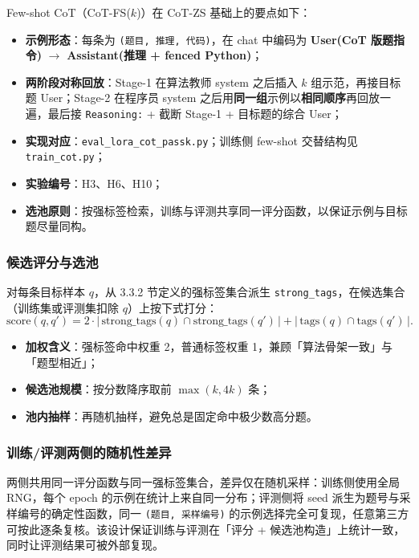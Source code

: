 
Few-shot CoT（CoT-FS($k$)）在 CoT-ZS 基础上的要点如下：
\begin{itemize}
    \item \textbf{示例形态}：每条为 \texttt{(题目, 推理, 代码)}，在 chat 中编码为 \textbf{User(CoT 版题指令)} $\rightarrow$ \textbf{Assistant(推理 + fenced Python)}；
    \item \textbf{两阶段对称回放}：Stage-1 在算法教师 system 之后插入 $k$ 组示范，再接目标题 User；Stage-2 在程序员 system 之后用\textbf{同一组}示例以\textbf{相同顺序}再回放一遍，最后接 \texttt{Reasoning:} + 截断 Stage-1 + 目标题的综合 User；
    \item \textbf{实现对应}：\texttt{eval\_lora\_cot\_passk.py}；训练侧 few-shot 交替结构见 \texttt{train\_cot.py}；
    \item \textbf{实验编号}：H3、H6、H10；
    \item \textbf{选池原则}：按强标签检索，训练与评测共享同一评分函数，以保证示例与目标题尽量同构。
\end{itemize}

\subsubsection{候选评分与选池}
对每条目标样本 $q$，从 3.3.2 节定义的强标签集合派生 \texttt{strong\_tags}，在候选集合（训练集或评测集扣除 $q$）上按下式打分：
\[
\mathrm{score}(q, q') = 2 \cdot \bigl|\,\mathrm{strong\_tags}(q) \cap \mathrm{strong\_tags}(q')\,\bigr|
                       + \bigl|\,\mathrm{tags}(q) \cap \mathrm{tags}(q')\,\bigr|.
\]
\begin{itemize}
    \item \textbf{加权含义}：强标签命中权重 2，普通标签权重 1，兼顾「算法骨架一致」与「题型相近」；
    \item \textbf{候选池规模}：按分数降序取前 $\max(k, 4k)$ 条；
    \item \textbf{池内抽样}：再随机抽样，避免总是固定命中极少数高分题。
\end{itemize}

\subsubsection{训练/评测两侧的随机性差异}
两侧共用同一评分函数与同一强标签集合，差异仅在随机采样：训练侧使用全局 RNG，每个 epoch 的示例在统计上来自同一分布；评测侧将 seed 派生为题号与采样编号的确定性函数，同一 \texttt{(题目, 采样编号)} 的示例选择完全可复现，任意第三方可按此逐条复核。该设计保证训练与评测在「评分 + 候选池构造」上统计一致，同时让评测结果可被外部复现。

